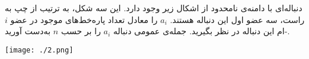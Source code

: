\begin{PROBLEM}
	\p
	دنباله‌ای با دامنه‌ی نامحدود از اشکال زیر وجود دارد. این سه شکل، به ترتیب از چپ به راست، سه عضو اول این دنباله هستند.‌
	 $a_i$
	را معادل تعداد پاره‌خط‌های موجود در عضو 
	$i$-ام این دنباله در نظر بگیرید.
	جمله‌ی عمومی دنباله $a_i$ را بر حسب
	$n$
	به‌دست آورید.
    \begin{center}
     	\texttt{[image: ./2.png]}
    \end{center}
\end{PROBLEM}